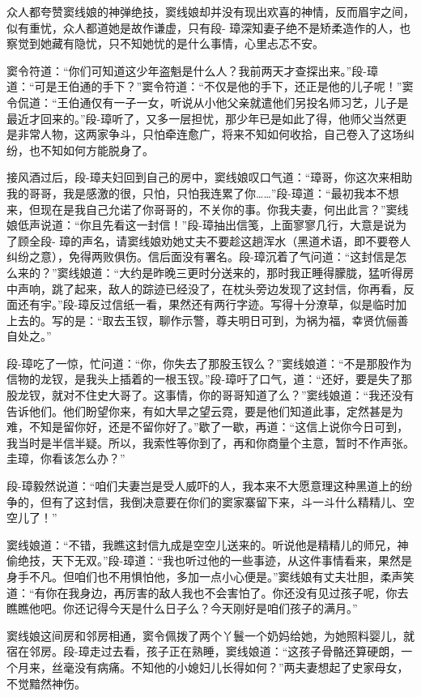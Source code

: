 \documentclass[12pt,oneside]{book}
\begin{document}
众人都夸赞窦线娘的神弹绝技，窦线娘却并没有现出欢喜的神情，反而眉宇之间，似有重忧，众人都道她是故作谦虚，只有段-
璋深知妻子绝不是矫柔造作的人，也察觉到她藏有隐忧，只不知她忧的是什么事情，心里忐忑不安。

窦令符道：``你们可知道这少年盗魁是什么人？我前两天才查探出来。''段-璋道：``可是王伯通的手下？''窦令符道：``不仅是他的手下，还正是他的儿子呢！''窦令侃道：``王伯通仅有一子一女，听说从小他父亲就遣他们另投名师习艺，儿子是最近才回来的。''段-璋听了，又多一层担忧，那少年已是如此了得，他师父当然更是非常人物，这两家争斗，只怕牵连愈广，将来不知如何收拾，自己卷入了这场纠纷，也不知如何方能脱身了。

接风酒过后，段-璋夫妇回到自己的房中，窦线娘叹口气道：``璋哥，你这次来相助我的哥哥，我是感激的很，只怕，只怕我连累了你\ldots\ldots{}''段-璋道：``最初我本不想来，但现在是我自己允诺了你哥哥的，不关你的事。你我夫妻，何出此言？''窦线娘低声说道：``你且先看这一封信！''段-璋抽出信笺，上面寥寥几行，大意是说为了顾全段-
璋的声名，请窦线娘劝她丈夫不要趁这趟浑水（黑道术语，即不要卷人纠纷之意），免得两败俱伤。信后面没有署名。段-璋沉着了气问道：``这封信是怎么来的？''窦线娘道：``大约是昨晚三更时分送来的，那时我正睡得朦胧，猛听得房中声响，跳了起来，敌人的踪迹已经没了，在枕头旁边发现了这封信，你再看，反面还有宇。''段-璋反过信纸一看，果然还有两行字迹。写得十分潦草，似是临时加上去的。写的是：``取去玉钗，聊作示警，尊夫明日可到，为祸为福，幸贤伉俪善自处之。''

段-璋吃了一惊，忙问道：``你，你失去了那股玉钗么？''窦线娘道：``不是那股作为信物的龙钗，是我头上插着的一根玉钗。''段-璋吁了口气，道：``还好，要是失了那股龙钗，就对不住史大哥了。这事情，你的哥哥知道了么？''窦线娘道：``我还没有告诉他们。他们盼望你来，有如大旱之望云霓，要是他们知道此事，定然甚是为难，不知是留你好，还是不留你好了。''歇了一歇，再道：``这信上说你今日可到，我当时是半信半疑。所以，我索性等你到了，再和你商量个主意，暂时不作声张。圭璋，你看该怎么办？''

段-璋毅然说道：``咱们夫妻岂是受人威吓的人，我本来不大愿意理这种黑道上的纷争的，但有了这封信，我倒决意要在你们的窦家寨留下来，斗一斗什么精精儿、空空儿了！''

窦线娘道：``不错，我瞧这封信九成是空空儿送来的。听说他是精精儿的师兄，神偷绝技，天下无双。''段-璋道：``我也听过他的一些事迹，从这件事情看来，果然是身手不凡。但咱们也不用惧怕他，多加一点小心便是。''窦线娘有丈夫壮胆，柔声笑道：``有你在我身边，再厉害的敌人我也不会害怕了。你还没有见过孩子呢，你去瞧瞧他吧。你还记得今天是什么日子么？今天刚好是咱们孩子的满月。''

窦线娘这间房和邻房相通，窦令佩拨了两个丫鬟一个奶妈给她，为她照料婴儿，就宿在邻房。段-璋走过去看，孩子正在熟睡，窦线娘道：``这孩子骨骼还算硬朗，一个月来，丝毫没有病痛。不知他的小媳妇儿长得如何？''两夫妻想起了史家母女，不觉黯然神伤。
\end{document}
